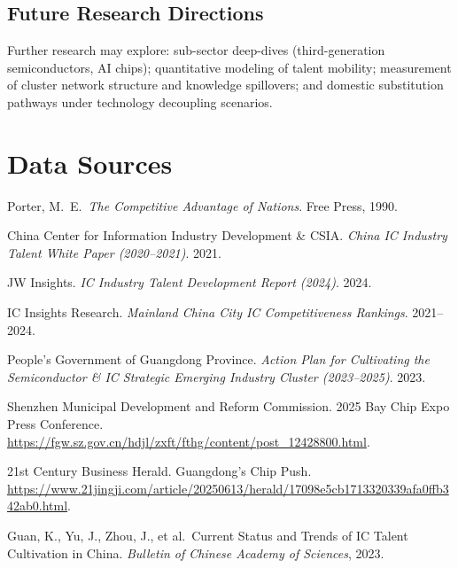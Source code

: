 \documentclass[12pt,a4paper]{article}
\begin{document}
\subsection{Future Research Directions}
\label{sec:outlook}

Further research may explore: sub-sector deep-dives (third-generation
semiconductors, AI chips); quantitative modeling of talent mobility;
measurement of cluster network structure and knowledge spillovers;
and domestic substitution pathways under technology decoupling scenarios.

\newpage
\section{Data Sources}
\label{sec:references}

\begin{enumerate}[label={[\arabic*]}]
    \item Porter, M.\ E.\ \textit{The Competitive Advantage of Nations}.
          Free Press, 1990.
    \item China Center for Information Industry Development \& CSIA.
          \textit{China IC Industry Talent White Paper (2020--2021)}. 2021.
    \item JW Insights. \textit{IC Industry Talent Development Report (2024)}. 2024.
    \item IC Insights Research. \textit{Mainland China City IC Competitiveness
          Rankings}. 2021--2024.
    \item People's Government of Guangdong Province.
          \textit{Action Plan for Cultivating the Semiconductor \& IC
          Strategic Emerging Industry Cluster (2023--2025)}. 2023.
    \item Shenzhen Municipal Development and Reform Commission.
          2025 Bay Chip Expo Press Conference.
          \url{https://fgw.sz.gov.cn/hdjl/zxft/fthg/content/post_12428800.html}.
    \item 21st Century Business Herald. Guangdong's Chip Push.
          \url{https://www.21jingji.com/article/20250613/herald/17098e5cb1713320339afa0ffb342ab0.html}.
    \item Guan, K., Yu, J., Zhou, J., et al.\ Current Status and Trends of
          IC Talent Cultivation in China. \textit{Bulletin of Chinese Academy
          of Sciences}, 2023.
\end{enumerate}
\end{document}
